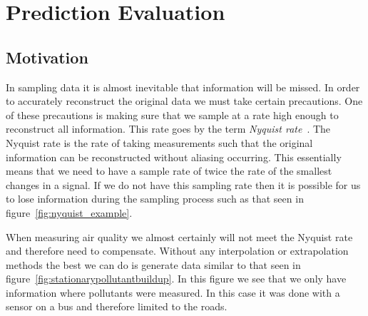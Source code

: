 \chapter{Prediction Evaluation}\label{prediction_evaluation}

	\section{Motivation}\label{prediction_evaluation_motivation}

		In sampling data it is almost inevitable that information will be missed. In order to accurately reconstruct the original data we must take certain precautions. One of these precautions is making sure that we sample at a rate high enough to reconstruct all information. This rate goes by the term \emph{Nyquist rate}~\cite{nyquistrate}. The Nyquist rate is the rate of taking measurements such that the original information can be reconstructed without aliasing occurring. This essentially means that we need to have a sample rate of twice the rate of the smallest changes in a signal. If we do not have this sampling rate then it is possible for us to lose information during the sampling process such as that seen in figure~\ref{fig:nyquist_example}.


		When measuring air quality we almost certainly will not meet the Nyquist rate and therefore need to compensate. Without any interpolation or extrapolation methods the best we can do is generate data similar to that seen in figure~\ref{fig:stationarypollutantbuildup}. In this figure we see that we only have information where pollutants were measured. In this case it was done with a sensor on a bus and therefore limited to the roads. 



